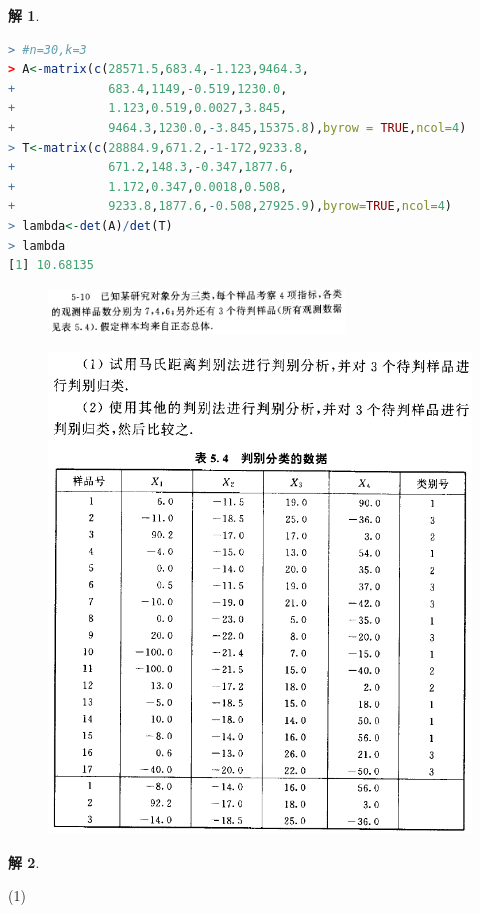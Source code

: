 \documentclass[11pt,a4paper]{ctexart}
\newtheorem*{solution}{解}
\begin{document}
\begin{solution}
\end{solution}
\begin{lstlisting}[language=r]
> #n=30,k=3
> A<-matrix(c(28571.5,683.4,-1.123,9464.3,
+             683.4,1149,-0.519,1230.0,
+             1.123,0.519,0.0027,3.845,
+             9464.3,1230.0,-3.845,15375.8),byrow = TRUE,ncol=4)
> T<-matrix(c(28884.9,671.2,-1-172,9233.8,
+             671.2,148.3,-0.347,1877.6,
+             1.172,0.347,0.0018,0.508,
+             9233.8,1877.6,-0.508,27925.9),byrow=TRUE,ncol=4)
> lambda<-det(A)/det(T)
> lambda
[1] 10.68135
\end{lstlisting}

\begin{figure}[H]
	\includegraphics[width=0.7\textwidth]{screenshot003}
\end{figure}
\begin{figure}[H]
	\includegraphics[width=0.7\linewidth]{screenshot004}
\end{figure}
\begin{solution}
\end{solution}
(1)
\end{document}
